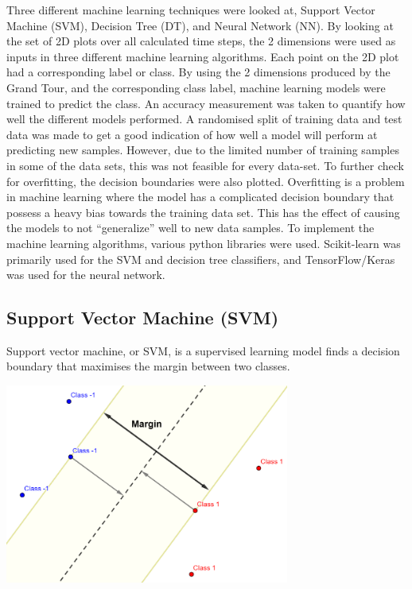 \documentclass[a4paper,11pt,twoside]{article}
\begin{document}
Three different machine learning techniques were looked at, Support Vector Machine (SVM), Decision Tree (DT), and Neural Network (NN). By looking at the set of 2D plots over all calculated time steps, the 2 dimensions were used as inputs in three different machine learning algorithms. Each point on the 2D plot had a corresponding label or class. By using the 2 dimensions produced by the Grand Tour, and the corresponding class label, machine learning models were trained to predict the class. An accuracy measurement was taken to quantify how well the different models performed. A randomised split of training data and test data was made to get a good indication of how well a model will perform at predicting new samples. However, due to the limited number of training samples in some of the data sets, this was not feasible for every data-set. To further check for overfitting, the decision boundaries were also plotted.
\newline
\newline
Overfitting is a problem in machine learning where the model has a complicated decision boundary that possess a heavy bias towards the training data set. This has the effect of causing the models to not “generalize” well to new data samples.
\newline
\newline
To implement the machine learning algorithms, various python libraries were used. Scikit-learn was primarily used for the SVM and decision tree classifiers, and TensorFlow/Keras was used for the neural network.

\newpage
\subsection{Support Vector Machine (SVM)}

Support vector machine, or SVM, is a supervised learning model finds a decision boundary that maximises the margin between two classes. 

\begin{center}
\includegraphics[width=0.7\textwidth]{SVM.png}

\end{center}
\end{document}
